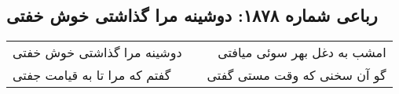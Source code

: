 \begin{center}
\section*{رباعی شماره ۱۸۷۸: دوشینه مرا گذاشتی خوش خفتی}
\label{sec:1878}
\begin{longtable}{l p{0.5cm} r}
دوشینه مرا گذاشتی خوش خفتی
&&
امشب به دغل بهر سوئی میافتی
\\
گفتم که مرا تا به قیامت جفتی
&&
گو آن سخنی که وقت مستی گفتی
\\
\end{longtable}
\end{center}
